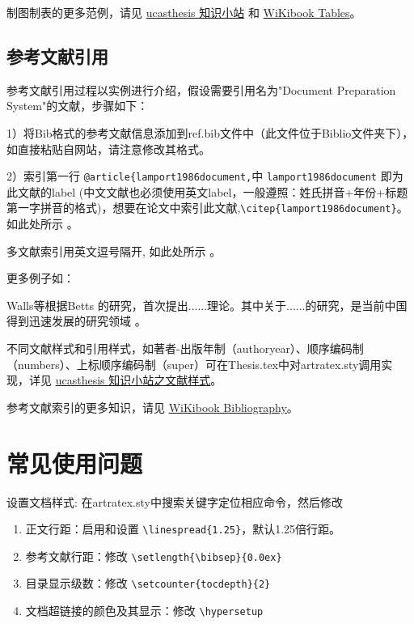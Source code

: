 {制图制表的更多范例，请见 \href{https://github.com/mohuangrui/ucasthesis/wiki}{ucasthesis 知识小站} 和 \href{https://en.wikibooks.org/wiki/LaTeX/Tables}{WiKibook Tables}。

\subsection{参考文献引用}

参考文献引用过程以实例进行介绍，假设需要引用名为"Document Preparation System"的文献，步骤如下：

1）将Bib格式的参考文献信息添加到ref.bib文件中（此文件位于Biblio文件夹下），如直接粘贴自网站，请注意修改其格式。

2）索引第一行 \verb|@article{lamport1986document,|中 \verb|lamport1986document| 即为此文献的label (中文文献也必须使用英文label，一般遵照：姓氏拼音+年份+标题第一字拼音的格式)，想要在论文中索引此文献,\verb|\citep{lamport1986document}|。如此处所示 \citep{lamport1986document}。

多文献索引用英文逗号隔开, 如此处所示 \citep{lamport1986document, chu2004tushu, chen2005zhulu}。

更多例子如：

Walls等\citep{walls2013drought}根据Betts\citep{betts2005aging} 的研究，首次提出......理论。其中关于......的研究\citep{walls2013drought, betts2005aging}，是当前中国得到迅速发展的研究领域 \citep{chen1980zhongguo, bravo1990comparative}。

不同文献样式和引用样式，如著者-出版年制（authoryear）、顺序编码制（numbers）、上标顺序编码制（super）可在Thesis.tex中对artratex.sty调用实现，详见 \href{https://github.com/mohuangrui/ucasthesis/wiki}{ucasthesis 知识小站之文献样式}。


参考文献索引的更多知识，请见 \href{https://en.wikibooks.org/wiki/LaTeX/Bibliography_Management}{WiKibook Bibliography}。\nocite{*}%

\section{常见使用问题}\label{sec:qa}

设置文档样式: 在artratex.sty中搜索关键字定位相应命令，然后修改
\begin{enumerate}
    \item 正文行距：启用和设置 \verb|\linespread{1.25}|，默认1.25倍行距。
    \item 参考文献行距：修改 \verb|\setlength{\bibsep}{0.0ex}|
    \item 目录显示级数：修改 \verb|\setcounter{tocdepth}{2}|
    \item 文档超链接的颜色及其显示：修改 \verb|\hypersetup|
\end{enumerate}

}
